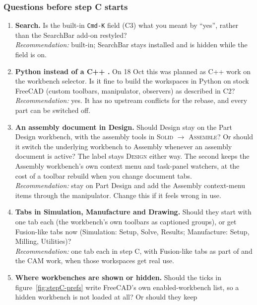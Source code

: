 \subsubsection*{Questions before step C starts}

\begin{enumerate}
  \item \textbf{Search.} Is the built-in \texttt{Cmd-K} field (C3) what you meant by ``yes'', rather than the
        SearchBar add-on restyled?\\
        \emph{Recommendation:} built-in; SearchBar stays installed and is hidden while the field is on.
  \item \textbf{Python instead of a C++ .} On 18 Oct this was planned as C++ work on the
        workbench selector. Is it fine to build the workspaces in Python on stock FreeCAD (custom toolbars,
        manipulator, observers) as described in C2?\\
        \emph{Recommendation:} yes. It has no upstream conflicts for the rebase, and every part can be
        switched off.
  \item \textbf{An assembly document in Design.} Should Design stay on the Part Design workbench, with the
        assembly tools in \textsc{Solid $\rightarrow$ Assemble}? Or should it switch the underlying workbench
        to Assembly whenever an assembly document is active? The label stays \textsc{Design} either way. The
        second keeps the Assembly workbench's own context menu and task-panel watchers, at the cost of a
        toolbar rebuild when you change document tabs.\\
        \emph{Recommendation:} stay on Part Design and add the Assembly context-menu items through the
        manipulator. Change this if it feels wrong in use.
  \item \textbf{Tabs in Simulation, Manufacture and Drawing.} Should they start with one tab each (the
        workbench's own toolbars as captioned groups), or get Fusion-like tabs now (Simulation: Setup,
        Solve, Results; Manufacture: Setup, Milling, Utilities)?\\
        \emph{Recommendation:} one tab each in step C, with Fusion-like tabs as part of  and the
        CAM work, when those workspaces get real use.
  \item \textbf{Where workbenches are shown or hidden.} Should the ticks in figure~\ref{fig:stepC-prefs} write
        FreeCAD's own enabled-workbench list, so a hidden workbench is not loaded at all? Or should they keep

\end{enumerate}

